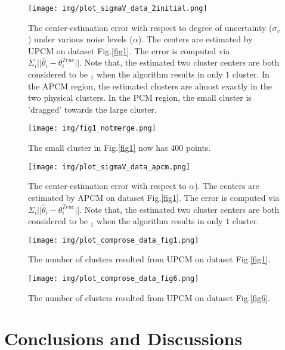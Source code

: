 \documentclass[journal]{IEEEtran}
\begin{document}
\begin{figure}[htb]
\centering
\texttt{[image: img/plot\_sigmaV\_data\_2initial.png]}
\caption{\label{fig_transition_apcm_pcm}The center-estimation error with respect to degree of uncertainty ($\sigma_v$) under various noise levels ($\alpha$). The centers are estimated by UPCM on dataset Fig.\ref{fig1}. The error is computed via $\Sigma_i||\hat{\theta}_i-\theta_i^{True}||$. Note that, the estimated two cluster centers are both considered to be \hat{\theta}$_{\text{1}}$ when the algorithm results in only $1$ cluster. In the APCM region, the estimated clusters are almost exactly in the two physical clusters. In the PCM region, the small cluster is 'dragged' towards the large cluster.}
\end{figure}

\begin{figure}[htb]
\centering
\texttt{[image: img/fig1\_notmerge.png]}
\caption{\label{fig1_notmerge}The small cluster in Fig.\ref{fig1} now has 400 points.}
\end{figure}




\begin{figure}[htb]
\centering
\texttt{[image: img/plot\_sigmaV\_data\_apcm.png]}
\caption{\label{fig_apcm_estimation_error}The center-estimation error with respect to $\alpha$). The centers are estimated by APCM on dataset Fig.\ref{fig1}. The error is computed via $\Sigma_i||\hat{\theta}_i-\theta_i^{True}||$. Note that, the estimated two cluster centers are both considered to be \hat{\theta}$_{\text{1}}$ when the algorithm results in only $1$ cluster.}
\end{figure}


\begin{figure}[htb]
\centering
\texttt{[image: img/plot\_comprose\_data\_fig1.png]}
\caption{\label{fig1_comprose}The number of clusters resulted from UPCM on dataset Fig.\ref{fig1}.}
\end{figure}
\begin{figure}[htb]
\centering
\texttt{[image: img/plot\_comprose\_data\_fig6.png]}
\caption{\label{fig6_comprose}The number of clusters resulted from UPCM on dataset Fig.\ref{fig6}.}
\end{figure}





\section{Conclusions and Discussions}
\label{sec-5}
\end{document}
